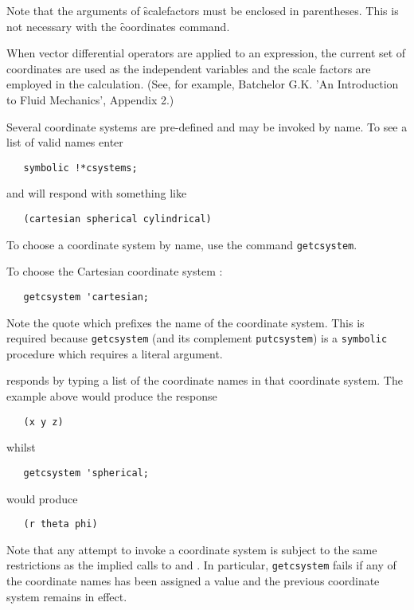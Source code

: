 Note that the arguments of \f{scalefactors} must be enclosed in
parentheses. This is not necessary with the \f{coordinates} command.


When vector differential operators are applied to an expression,
the current set of coordinates are used as the independent
variables and the scale factors are employed in the calculation.
(See, for example, Batchelor G.K. 'An Introduction to Fluid
Mechanics', Appendix 2.)


\hypertarget{reserved:!*CSYSTEMS}{}
Several coordinate systems are pre-defined and may be invoked by
name. To see a list of valid names enter
\begin{verbatim}
   symbolic !*csystems;
\end{verbatim}
and \REDUCE will respond with something like
\begin{verbatim}
   (cartesian spherical cylindrical)
\end{verbatim}

\hypertarget{command:GETCSYSTEM}{}
To choose a coordinate system by name, use the command \texttt{getcsystem}.

To choose the Cartesian coordinate system :
\begin{verbatim}
   getcsystem 'cartesian;
\end{verbatim}
\hypertarget{command:PUTCSYSTEM}{}
Note the quote which prefixes the name of the coordinate system. This
is required because \texttt{getcsystem} (and its complement \texttt{putcsystem})
is a \texttt{symbolic} procedure which requires a literal
argument.

\REDUCE responds by typing a list of the coordinate names in that
coordinate system. The example above would produce the response
\begin{verbatim}
   (x y z)
\end{verbatim}
whilst
\begin{verbatim}
   getcsystem 'spherical;
\end{verbatim}
would produce
\begin{verbatim}
   (r theta phi)
\end{verbatim}
Note that any attempt to invoke a coordinate system is subject to the
same restrictions as the implied calls to  and .
In particular, \texttt{getcsystem} fails if any of the
coordinate names has been assigned a value and the previous coordinate
system remains in effect.

